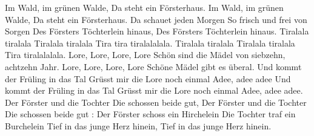 \beginverse
Im Wald, im grünen Walde,
Da steht ein Försterhaus.
Im Wald, im grünen Walde,
Da steht ein Försterhaus.
Da schauet jeden Morgen
So frisch und frei von Sorgen
Des Försters Töchterlein hinaus,
Des Försters Töchterlein hinaus.
\endverse
\beginchorus
Tiralala tiralala
Tiralala tiralala
Tira tira tiralalalala.
Tiralala tiralala
Tiralala tiralala
Tira tiralalalala.
Lore, Lore, Lore, Lore
Schön sind die Mädel von siebzehn, achtzehn Jahr.
Lore, Lore, Lore, Lore
Schöne Mädel gibt es überal.
Und kommt der Früling in das Tal
Grüsst mir die Lore noch einmal
Adee, adee adee
Und kommt der Früling in das Tal
Grüsst mir die Lore noch einmal
Adee, adee adee.
\endchorus
\beginverse
Der Förster und die Tochter
Die schossen beide gut,
Der Förster und die Tochter
Die schossen beide gut :
Der Förster schoss ein Hirchelein
Die Tochter traf ein Burchelein
Tief in das junge Herz hinein,
Tief in das junge Herz hinein.
\endverse
\endsong